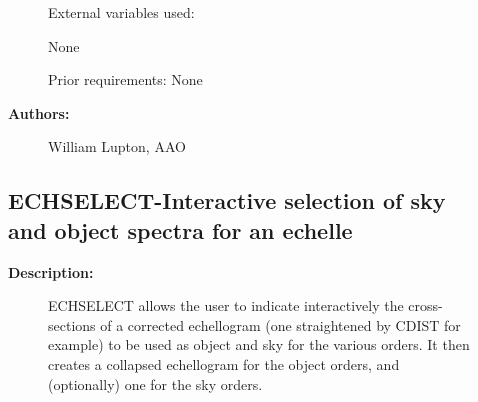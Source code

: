 \begin{description}
\begin{description}
\begin{terminalv}
 External variables used:

    None

 Prior requirements:
    None

\end{terminalv}

\item [\textbf{Authors:}]
 William Lupton, AAO
\end{description}
\subsection{ECHSELECT-\label{ECHSELECT}Interactive selection of sky and object spectra for an echelle}
\begin{description}

\item [\textbf{Description:}]
 ECHSELECT allows the user to indicate interactively the cross-sections
 of a corrected echellogram (one straightened by CDIST for example) to
 be used as object and sky for the various orders.  It then creates a
 collapsed echellogram for the object orders, and (optionally) one for
 the sky orders.


\end{description}
\end{description}
